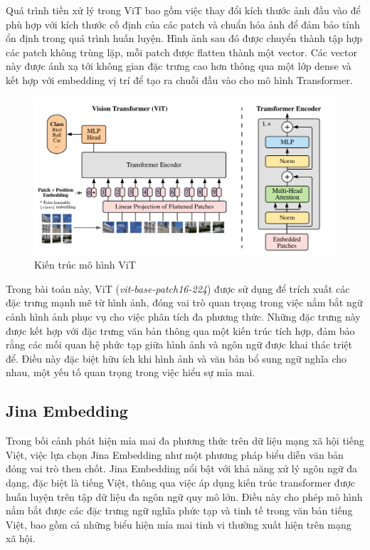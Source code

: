 \documentclass[11pt]{article}
\begin{document}
Quá trình tiền xử lý trong ViT bao gồm việc thay đổi kích thước ảnh đầu vào để phù hợp với kích thước cố định của các patch và chuẩn hóa ảnh để đảm bảo tính ổn định trong quá trình huấn luyện. Hình ảnh sau đó được chuyển thành tập hợp các patch không trùng lặp, mỗi patch được flatten thành một vector. Các vector này được ánh xạ tới không gian đặc trưng cao hơn thông qua một lớp dense và kết hợp với embedding vị trí để tạo ra chuỗi đầu vào cho mô hình Transformer.

\begin{figure}[h!]
\centering
\includegraphics[width=1.0\linewidth]{vit_figure.png}
\caption{Kiến trúc mô hình ViT}
\end{figure}
\vspace*{-5mm}
Trong bài toán này, ViT (\textit{vit-base-patch16-224}) được sử dụng để trích xuất các đặc trưng mạnh mẽ từ hình ảnh, đóng vai trò quan trọng trong việc nắm bắt ngữ cảnh hình ảnh phục vụ cho việc phân tích đa phương thức. Những đặc trưng này được kết hợp với đặc trưng văn bản thông qua một kiến trúc tích hợp, đảm bảo rằng các mối quan hệ phức tạp giữa hình ảnh và ngôn ngữ được khai thác triệt để. Điều này đặc biệt hữu ích khi hình ảnh và văn bản bổ sung ngữ nghĩa cho nhau, một yếu tố quan trọng trong việc hiểu sự mỉa mai.


\subsection{Jina Embedding}

\hspace*{5mm}Trong bối cảnh phát hiện mỉa mai đa phương thức trên dữ liệu mạng xã hội tiếng Việt, việc lựa chọn Jina Embedding như một phương pháp biểu diễn văn bản đóng vai trò then chốt. Jina Embedding nổi bật với khả năng xử lý ngôn ngữ đa dạng, đặc biệt là tiếng Việt, thông qua việc áp dụng kiến trúc transformer được huấn luyện trên tập dữ liệu đa ngôn ngữ quy mô lớn. Điều này cho phép mô hình nắm bắt được các đặc trưng ngữ nghĩa phức tạp và tinh tế trong văn bản tiếng Việt, bao gồm cả những biểu hiện mỉa mai tinh vi thường xuất hiện trên mạng xã hội.
\end{document}
